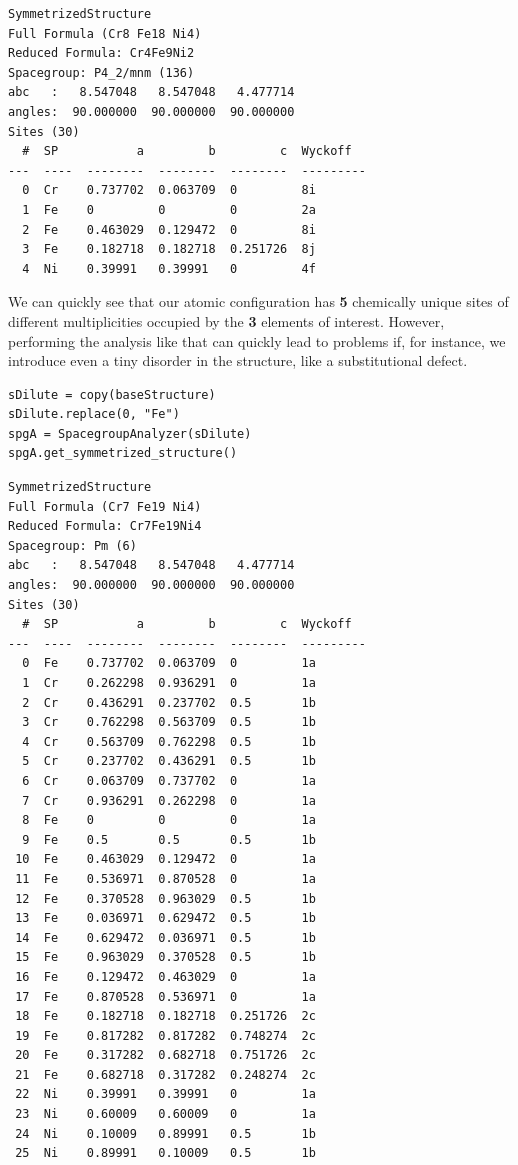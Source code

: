 \begin{verbatim}
SymmetrizedStructure
Full Formula (Cr8 Fe18 Ni4)
Reduced Formula: Cr4Fe9Ni2
Spacegroup: P4_2/mnm (136)
abc   :   8.547048   8.547048   4.477714
angles:  90.000000  90.000000  90.000000
Sites (30)
  #  SP           a         b         c  Wyckoff
---  ----  --------  --------  --------  ---------
  0  Cr    0.737702  0.063709  0         8i
  1  Fe    0         0         0         2a
  2  Fe    0.463029  0.129472  0         8i
  3  Fe    0.182718  0.182718  0.251726  8j
  4  Ni    0.39991   0.39991   0         4f
\end{verbatim}

We can quickly see that our atomic configuration has \textbf{5}
chemically unique sites of different multiplicities occupied by the
\textbf{3} elements of interest. However, performing the analysis like
that can quickly lead to problems if, for instance, we introduce even a
tiny disorder in the structure, like a substitutional defect.

\begin{verbatim}
sDilute = copy(baseStructure)
sDilute.replace(0, "Fe")
spgA = SpacegroupAnalyzer(sDilute)
spgA.get_symmetrized_structure()
\end{verbatim}

\begin{verbatim}
SymmetrizedStructure
Full Formula (Cr7 Fe19 Ni4)
Reduced Formula: Cr7Fe19Ni4
Spacegroup: Pm (6)
abc   :   8.547048   8.547048   4.477714
angles:  90.000000  90.000000  90.000000
Sites (30)
  #  SP           a         b         c  Wyckoff
---  ----  --------  --------  --------  ---------
  0  Fe    0.737702  0.063709  0         1a
  1  Cr    0.262298  0.936291  0         1a
  2  Cr    0.436291  0.237702  0.5       1b
  3  Cr    0.762298  0.563709  0.5       1b
  4  Cr    0.563709  0.762298  0.5       1b
  5  Cr    0.237702  0.436291  0.5       1b
  6  Cr    0.063709  0.737702  0         1a
  7  Cr    0.936291  0.262298  0         1a
  8  Fe    0         0         0         1a
  9  Fe    0.5       0.5       0.5       1b
 10  Fe    0.463029  0.129472  0         1a
 11  Fe    0.536971  0.870528  0         1a
 12  Fe    0.370528  0.963029  0.5       1b
 13  Fe    0.036971  0.629472  0.5       1b
 14  Fe    0.629472  0.036971  0.5       1b
 15  Fe    0.963029  0.370528  0.5       1b
 16  Fe    0.129472  0.463029  0         1a
 17  Fe    0.870528  0.536971  0         1a
 18  Fe    0.182718  0.182718  0.251726  2c
 19  Fe    0.817282  0.817282  0.748274  2c
 20  Fe    0.317282  0.682718  0.751726  2c
 21  Fe    0.682718  0.317282  0.248274  2c
 22  Ni    0.39991   0.39991   0         1a
 23  Ni    0.60009   0.60009   0         1a
 24  Ni    0.10009   0.89991   0.5       1b
 25  Ni    0.89991   0.10009   0.5       1b
\end{verbatim}

